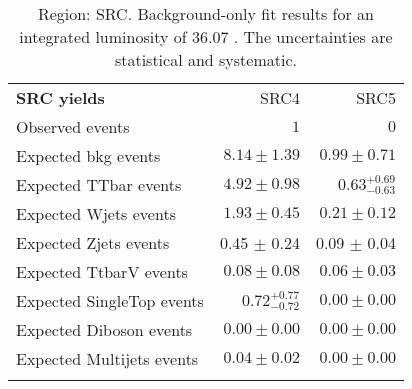 \begin{table}[!h]
\begin{center}
{\begin{tabular*}{\textwidth}{@{\extracolsep{\fill}}lrr}
\noalign{\smallskip}\hline\noalign{\smallskip}
{\bf SRC yields}           & SRC4            & SRC5              \\[-0.05cm]
\noalign{\smallskip}\hline\noalign{\smallskip}
Observed events          & $1$              & $0$                    \\
\noalign{\smallskip}\hline\noalign{\smallskip}
Expected bkg events         & $8.14 \pm 1.39$          & $0.99 \pm 0.71$              \\
\noalign{\smallskip}\hline\noalign{\smallskip}
        Expected TTbar events         & $4.92 \pm 0.98$          & $0.63_{-0.63}^{+0.69}$              \\
        Expected Wjets events         & $1.93 \pm 0.45$          & $0.21 \pm 0.12$              \\
        Expected Zjets events         & 0.45 $\pm$ 0.24          & 0.09 $\pm$ 0.04             \\
        Expected TtbarV events         & $0.08 \pm 0.08$          & $0.06 \pm 0.03$              \\
        Expected SingleTop events         & $0.72_{-0.72}^{+0.77}$          & $0.00 \pm 0.00$              \\
        Expected Diboson events         & $0.00 \pm 0.00$          & $0.00 \pm 0.00$              \\
        Expected Multijets events         & $0.04 \pm 0.02$          & $0.00 \pm 0.00$              \\
 \noalign{\smallskip}\hline\noalign{\smallskip}
\end{tabular*}

}
\end{center}
\caption{Region: SRC. Background-only fit results for an integrated luminosity of 36.07 \ifb. The uncertainties are statistical and systematic.
}
\label{table.bkgonly.SRC1to3}
\end{table}
%

